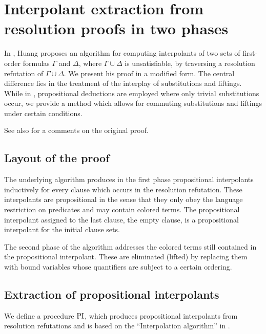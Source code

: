 \chapter{Interpolant extraction from resolution proofs in two phases}

In \cite{Huang95}, Huang proposes an algorithm for computing interpolants of two sets of first-order formulas $\Gamma$ and $\Delta$, where $\Gamma\cup\Delta$ is unsatisfiable, by traversing a resolution refutation of $\Gamma \cup \Delta$.
We present his proof in a modified form.
The central difference lies in the treatment of the interplay of substitutions and liftings. While in \cite{Huang95}, propositional deductions are employed where only trivial substitutions occur, we provide a method which allows for commuting substitutions and liftings under certain conditions.

See also \mytodo{} for a comments on the original proof.

\section{Layout of the proof}

The underlying algorithm produces in the first phase propositional interpolants inductively for every clause which occurs in the resolution refutation.
These interpolants are propositional in the sense that they only obey the language restriction on predicates and may contain colored terms.
The propositional interpolant assigned to the last clause, the empty clause, is a propositional interpolant for the initial clause sets.

The second phase of the algorithm addresses the colored terms still contained in the propositional interpolant.
These are eliminated (lifted) by replacing them with bound variables whose quantifiers are subject to a certain ordering.



\section{Extraction of propositional interpolants}

We define a procedure $\operatorname{PI}$, which produces propositional interpolants from resolution refutations and is based on the ``Interpolation algorithm'' in \cite{Huang95}.


